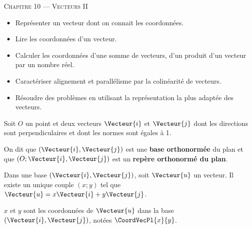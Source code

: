 \documentclass[a4paper]{article}
\begin{document}
\begin{center}
  {\scshape\LARGE Chapitre 10 --- Vecteurs II\par}
\end{center}


\begin{savoirfaire}{}{}
    \begin{itemize}[label=$\square$]
        \item Représenter un vecteur dont on connait les coordonnées.
        \item Lire les coordonnées d’un vecteur.
        \item Calculer les coordonnées d’une somme de vecteurs, d’un produit d’un vecteur par un nombre réel.
        \item Caractériser alignement et parallélisme par la colinéarité de vecteurs.
        \item Résoudre des problèmes en utilisant la représentation la plus adaptée des vecteurs.
    \end{itemize}
\end{savoirfaire}

\begin{definition}{}{}
  Soit $O$ un point et deux vecteurs $\Vecteur{i}$ et $\Vecteur{j}$ dont les directions sont 
  perpendiculaires et dont les normes sont égales à 1.

  On dit que $(\Vecteur{i},\Vecteur{j})$ est une \textbf{base orthonormée} du plan 
  et que $(O;\Vecteur{i},\Vecteur{j})$ est un \textbf{repère orthonormé du plan}.
\end{definition}

\begin{definition}{}{}
  Dans une base $(\Vecteur{i},\Vecteur{j})$, soit $\Vecteur{u}$ un vecteur. Il existe un unique couple $(x;y)$ tel que $\Vecteur{u}=x\Vecteur{i}+y\Vecteur{j}$.


  $x$ et $y$ sont les coordonnées de $\Vecteur{u}$ dans la base $(\Vecteur{i},\Vecteur{j})$, 
  notées $\CoordVecPl{x}{y}$.
\end{definition}
\end{document}
